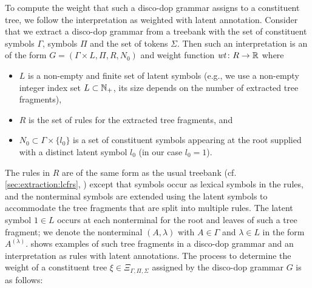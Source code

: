 \documentclass[../../document.tex]{subfiles}
\begin{document}
    To compute the weight that such a disco-dop grammar assigns to a constituent tree, we follow the interpretation as weighted  with latent annotation.
    Consider that we extract a disco-dop grammar from a treebank with the set of constituent symbols \(\varGamma\),  symbols \(\varPi\) and the set of tokens \(\varSigma\).
    Then such an interpretation is an  of the form \(G = (\varGamma \times L, \varPi, R, N_0)\) and weight function \(\mathit{wt}\colon R \to \mathbb{R}\)  where
    \begin{itemize}
        \item  \(L\) is a non-empty and finite set of latent symbols (e.g., we use a non-empty integer index set \(L \subset \mathbb{N}_+\), its size depends on the number of extracted tree fragments),
        \item \(R\) is the set of rules for the extracted tree fragments, and
        \item \(N_0 \subset \varGamma \times \{l_0\}\) is a set of constituent symbols appearing at the root supplied with a distinct latent symbol \(l_0\) (in our case \(l_0 = 1\)).
    \end{itemize}
    The rules in \(R\) are of the same form as the usual treebank  (cf.\@ \cref{sec:extraction:lcfrs}, ) except that  symbols occur as lexical symbols in the rules, and the nonterminal symbols are extended using the latent symbols to accommodate the tree fragments that are split into multiple rules.
    The latent symbol \(1 \in L\) occurs at each nonterminal for the root and leaves of such a tree fragment; we denote the nonterminal \((A, \lambda)\) with \(A\in \varGamma\) and \(\lambda \in L\) in the form \(A^{(\lambda)}\).
     shows examples of such tree fragments in a disco-dop grammar and an interpretation as  rules with latent annotations.
    The process to determine the weight of a constituent tree \(\xi \in \Xi_{\varGamma, \varPi, \varSigma}\) assigned by the disco-dop grammar \(G\) is as follows:
\end{document}
